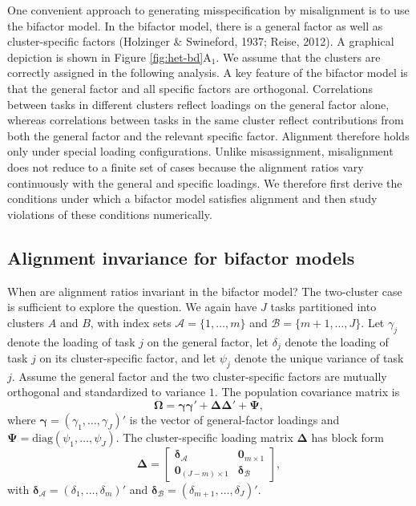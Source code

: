 \documentclass[
  american,
  man,floatsintext]{apa7}
\begin{document}
One convenient approach to generating misspecification by misalignment is to use the bifactor model. In the bifactor model, there is a general factor as well as cluster-specific factors (Holzinger \& Swineford, 1937; Reise, 2012). A graphical depiction is shown in Figure \ref{fig:het-bd}A\(_1\). We assume that the clusters are correctly assigned in the following analysis. A key feature of the bifactor model is that the general factor and all specific factors are orthogonal. Correlations between tasks in different clusters reflect loadings on the general factor alone, whereas correlations between tasks in the same cluster reflect contributions from both the general factor and the relevant specific factor. Alignment therefore holds only under special loading configurations. Unlike misassignment, misalignment does not reduce to a finite set of cases because the alignment ratios vary continuously with the general and specific loadings. We therefore first derive the conditions under which a bifactor model satisfies alignment and then study violations of these conditions numerically.

\subsection{Alignment invariance for bifactor models}\label{alignment-invariance-for-bifactor-models}

When are alignment ratios invariant in the bifactor model? The two-cluster case is sufficient to explore the question. We again have \(J\) tasks partitioned into clusters \(A\) and \(B\), with index sets \(\mathcal A=\{1,\ldots,m\}\) and \(\mathcal B=\{m+1,\ldots,J\}\). Let \(\gamma_j\) denote the loading of task \(j\) on the general factor, let \(\delta_j\) denote the loading of task \(j\) on its cluster-specific factor, and let \(\psi_j\) denote the unique variance of task \(j\). Assume the general factor and the two cluster-specific factors are mutually orthogonal and standardized to variance \(1\). The population covariance matrix is
\[
\pmb\Omega = \pmb\gamma\pmb\gamma' + \pmb\Delta\pmb\Delta' + \pmb\Psi,
\]
where \(\pmb\gamma=(\gamma_1,\ldots,\gamma_J)'\) is the vector of general-factor loadings and \(\pmb\Psi=\mathrm{diag}(\psi_1,\ldots,\psi_J)\). The cluster-specific loading matrix \(\pmb\Delta\) has block form
\[
\pmb\Delta = \begin{bmatrix}
\pmb\delta_{\mathcal A} & \pmb 0_{m\times1}\\
\pmb 0_{(J-m)\times 1} & \pmb\delta_{\mathcal B}
\end{bmatrix},
\]
with \(\pmb\delta_{\mathcal{A}}=(\delta_1,\ldots,\delta_m)'\) and \(\pmb\delta_{\mathcal{B}}=(\delta_{m+1},\ldots,\delta_J)'\).
\end{document}
